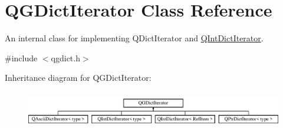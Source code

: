 \hypertarget{class_q_g_dict_iterator}{}\section{Q\+G\+Dict\+Iterator Class Reference}
\label{class_q_g_dict_iterator}


An internal class for implementing Q\+Dict\+Iterator and \mbox{\hyperlink{class_q_int_dict_iterator}{Q\+Int\+Dict\+Iterator}}.  




{\ttfamily \#include $<$qgdict.\+h$>$}

Inheritance diagram for Q\+G\+Dict\+Iterator\+:\begin{figure}[H]
\begin{center}
\leavevmode
\includegraphics[height=1.647059cm]{class_q_g_dict_iterator}
\end{center}
\end{figure}
